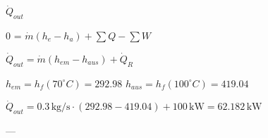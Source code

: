 \( \dot{Q}_{out} \)  

0 = \( \dot{m} (h_e - h_a) + \sum Q - \sum W \)  

\( \dot{Q}_{out} = \dot{m} (h_{em} - h_{aus}) + \dot{Q}_R \)  

\( h_{em} = h_f(70^\circ C) = 292.98 \)  
\( h_{aus} = h_f(100^\circ C) = 419.04 \)  

\( \dot{Q}_{out} = 0.3 \, \text{kg/s} \cdot (292.98 - 419.04) + 100 \, \text{kW} = 62.182 \, \text{kW} \)  

---